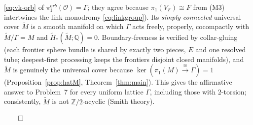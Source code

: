 \documentclass[12pt]{article}
\theoremstyle{definition}
\begin{document}
\begin{enumerate}
\eqref{eq:vk-orb} of $\pi_1^{orb}(\mathcal O)=\Gamma$; they agree because
$\pi_1(V_F)\cong F$ from (M3) intertwines the link monodromy
\eqref{eq:linkgroup}). Its \emph{simply connected} universal cover $\widetilde M$
is a smooth manifold on which $\Gamma$ acts freely, properly, cocompactly with
$\widetilde M/\Gamma=M$ and $\widetilde H_*(\widetilde M;\mathbb{Q})=0$.
Boundary-freeness is verified by collar-gluing (each frontier sphere bundle is
shared by exactly two pieces, $E$ and one resolved tube; deepest-first
processing keeps the frontiers disjoint closed manifolds), and $\widetilde M$ is
genuinely the universal cover because $\ker(\pi_1(M)\xrightarrow{\cong}\Gamma)=1$
(Proposition~\ref{prop:hatM}, Theorem~\ref{thm:main}). This gives the affirmative answer to
Problem~7 for every uniform lattice $\Gamma$, including those with $2$-torsion;
consistently, $\widetilde M$ is not $\mathbb{Z}/2$-acyclic (Smith theory).
\end{enumerate}
\hfill$\qed$
\end{document}
